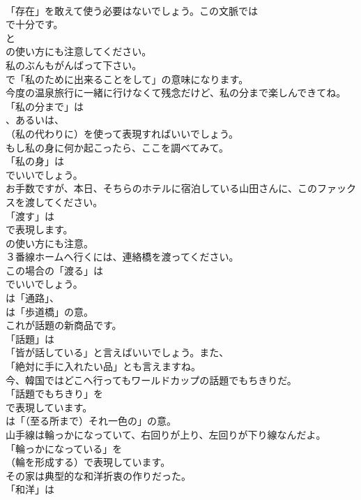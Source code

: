 \documentclass[8pt]{extreport}
\begin{document}
\begin{CJK}{UTF8}{min}
\\	「存在」を敢えて使う必要はないでしょう。この文脈では
\\	で十分です。
\\	と
\\	の使い方にも注意してください。	
\\	私のぶんもがんばって下さい。 
\\	で「私のために出来ることをして」の意味になります。	
\\	今度の温泉旅行に一緒に行けなくて残念だけど、私の分まで楽しんできてね。 
\\	「私の分まで」は 
\\	、あるいは、
\\	（私の代わりに）を使って表現すればいいでしょう。	
\\	もし私の身に何か起こったら、ここを調べてみて。 
\\	「私の身」は
\\	でいいでしょう。	
\\	お手数ですが、本日、そちらのホテルに宿泊している山田さんに、このファックスを渡してください。 
\\	「渡す」は 
\\	で表現します。
\\	の使い方にも注意。	
\\	３番線ホームへ行くには、連絡橋を渡ってください。 
\\	この場合の「渡る」は 
\\	でいいでしょう。
\\	は「通路」、
\\	は「歩道橋」の意。	
\\	これが話題の新商品です。 
\\	「話題」は
\\	「皆が話している」と言えばいいでしょう。また、
\\	「絶対に手に入れたい品」とも言えますね。	
\\	今、韓国ではどこへ行ってもワールドカップの話題でもちきりだ。 
\\	「話題でもちきり」を 
\\	で表現しています。
\\	は「（至る所まで）それ一色の」の意。	
\\	山手線は輪っかになっていて、右回りが上り、左回りが下り線なんだよ。 
\\	「輪っかになっている」を
\\	（輪を形成する）で表現しています。	
\\	その家は典型的な和洋折衷の作りだった。 
\\	「和洋」は

\end{CJK}
\end{document}
